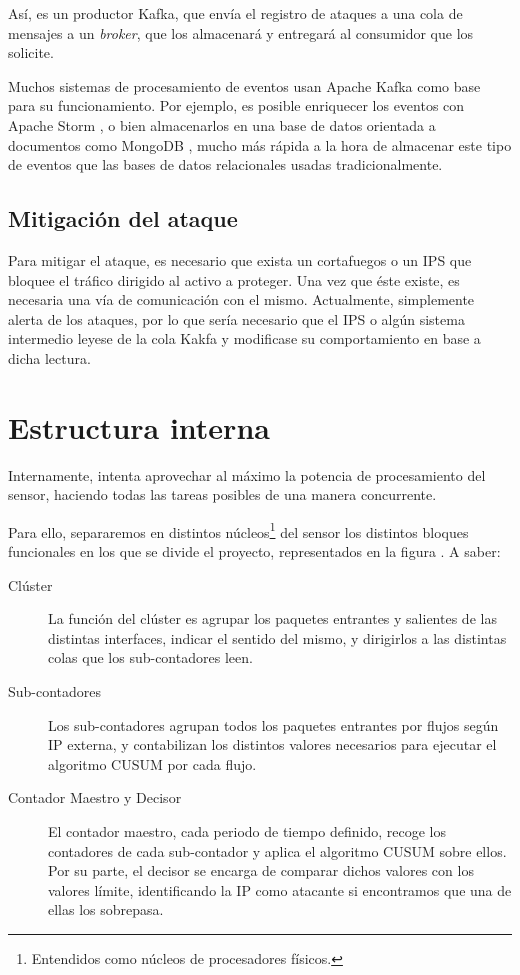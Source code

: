 Así, \redborderddos{} es un productor Kafka, que envía el registro de ataques a una cola de 
mensajes a un \emph{broker}, que los almacenará y entregará al consumidor que los solicite.

Muchos sistemas de procesamiento de eventos usan Apache Kafka como base para su funcionamiento. Por ejemplo, es posible 
enriquecer los eventos con Apache Storm \cite{ApacheStorm}, o bien almacenarlos en una base de 
datos orientada a documentos como MongoDB \cite{MongoDB}, mucho más rápida a la hora de almacenar este 
tipo de eventos que las bases de datos relacionales usadas tradicionalmente.

\subsection{Mitigación del ataque}
Para mitigar el ataque, es necesario que exista un cortafuegos o un \gls{IPS} que bloquee el tráfico dirigido al activo a proteger. Una vez que éste existe, es necesaria una vía 
de comunicación con el mismo. Actualmente, \redborderddos{} simplemente alerta de los ataques, por lo que sería 
necesario que el \gls{IPS} o algún sistema intermedio leyese de la cola Kakfa y modificase su comportamiento en base a 
dicha lectura.

\section{Estructura interna}
Internamente, \redborderddos{} intenta aprovechar al máximo la potencia de procesamiento del sensor, haciendo todas las 
tareas posibles de una manera concurrente.

Para ello, separaremos en distintos núcleos\footnote{Entendidos como núcleos de procesadores físicos.} del sensor los 
distintos bloques funcionales en los que se divide el proyecto, representados en la figura . A 
saber:

\begin{description}
 \item [Clúster] La función del clúster es agrupar los paquetes entrantes y salientes de las distintas 
interfaces, indicar el sentido del mismo, y dirigirlos a las distintas colas que los sub-contadores leen.
 \item [Sub-contadores] Los sub-contadores agrupan todos los paquetes entrantes por flujos según IP externa, y 
contabilizan los distintos valores necesarios para ejecutar el algoritmo \gls{CUSUM} por cada flujo.
 \item [Contador Maestro y Decisor] El contador maestro, cada periodo de tiempo definido, recoge los contadores de cada 
sub-contador y aplica el algoritmo \gls{CUSUM} sobre ellos. Por su parte, el decisor se encarga de comparar dichos 
valores con los valores límite, identificando la IP como atacante si encontramos que una de ellas los sobrepasa.
\end{description}

